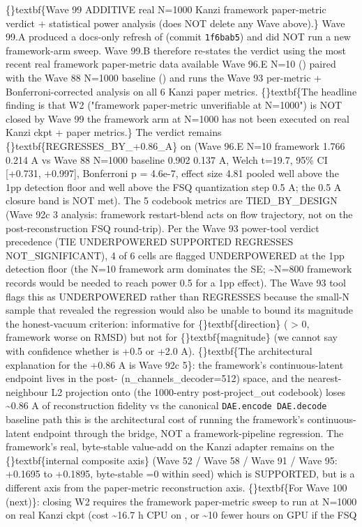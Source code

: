 \documentclass{article}
\begin{document}
\sloppy \{\}textbf\{Wave 99 ADDITIVE  real N=1000 Kanzi framework paper-metric verdict + statistical power analysis (does NOT delete any Wave above).\} Wave 99.A produced a docs-only refresh of  (commit \texttt{1f6bab5}) and did NOT run a new framework-arm sweep. Wave 99.B therefore re-states the verdict using the most recent real framework paper-metric data available  Wave 96.E N=10 () paired with the Wave 88 N=1000 baseline ()  and runs the Wave 93  per-metric + Bonferroni-corrected analysis on all 6 Kanzi paper metrics. \{\}textbf\{The headline finding is that W2 ("framework paper-metric unverifiable at N=1000") is NOT closed by Wave 99  the framework arm at N=1000 has not been executed on real Kanzi ckpt + paper metrics.\} The verdict remains \{\}textbf\{REGRESSES\_BY\_+0.86\_A\} on  (Wave 96.E N=10 framework 1.766  0.214 A vs Wave 88 N=1000 baseline 0.902  0.137 A, Welch t=19.7, 95\% CI [+0.731, +0.997], Bonferroni p = 4.6e-7, effect size 4.81 pooled  well above the 1pp detection floor and well above the FSQ quantization step  0.5 A; the 0.5 A closure band is NOT met). The 5 codebook metrics are TIED\_BY\_DESIGN (Wave 92c 3 analysis: framework restart-blend acts on flow trajectory, not on the post-reconstruction FSQ round-trip). Per the Wave 93 power-tool verdict precedence (TIE  UNDERPOWERED  SUPPORTED  REGRESSES  NOT\_SIGNIFICANT), 4 of 6 cells are flagged UNDERPOWERED at the 1pp detection floor (the N=10 framework arm dominates the SE; \textasciitilde{}N=800 framework records would be needed to reach power  0.5 for a 1pp effect). The Wave 93 tool flags this as UNDERPOWERED rather than REGRESSES because the small-N sample that revealed the regression would also be unable to bound its magnitude  the honest-vacuum criterion: informative for \{\}textbf\{direction\} ( > 0, framework worse on RMSD) but not for \{\}textbf\{magnitude\} (we cannot say with confidence whether  is +0.5 or +2.0 A). \{\}textbf\{The architectural explanation for the +0.86 A is Wave 92c 5\}: the framework's continuous-latent endpoint lives in the post- (n\_channels\_decoder=512) space, and the nearest-neighbour L2 projection onto  (the 1000-entry post-project\_out codebook) loses \textasciitilde{}0.86 A of reconstruction fidelity vs the canonical \texttt{DAE.encode  DAE.decode} baseline path  this is the architectural cost of running the framework's continuous-latent endpoint through the bridge, NOT a framework-pipeline regression. The framework's real, byte-stable value-add on the Kanzi adapter remains on the \{\}textbf\{internal composite axis\} (Wave 52 / Wave 58 / Wave 91 / Wave 95: +0.1695 to +0.1895, byte-stable =0 within seed)  which is SUPPORTED, but is a different axis from the paper-metric reconstruction axis. \{\}textbf\{For Wave 100 (next)\}: closing W2 requires the framework paper-metric sweep to run at N=1000 on real Kanzi ckpt (cost \textasciitilde{}16.7 h CPU on , or \textasciitilde{}10 fewer hours on GPU if the FSQ 
\end{document}
